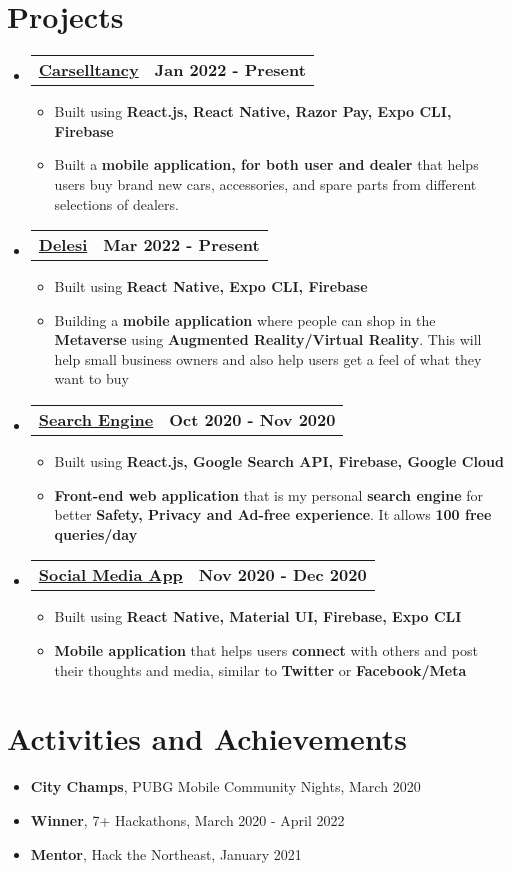\documentclass[letterpaper,7pt]{article}
\makeatletter
\newcommand{\resumeItem}[1]{
  \item\small{
    {#1 \vspace{-2pt}}
  }
}
\newcommand{\resumeProjectHeading}[2]{
    \item
    \begin{tabular*}{1.001\textwidth}{l@{\extracolsep{\fill}}r}
      \small#1 & \textbf{\small #2}\\
    \end{tabular*}\vspace{-7pt}
}
\newcommand{\resumeSubHeadingListStart}{\begin{itemize}[leftmargin=0.0in, label={}]}
\newcommand{\resumeSubHeadingListEnd}{\end{itemize}}
\newcommand{\resumeItemListStart}{\begin{itemize}}
\newcommand{\resumeItemListEnd}{\end{itemize}\vspace{-5pt}}
\makeatother
\begin{document}
\section{Projects}
    \resumeSubHeadingListStart
    \resumeProjectHeading
          {\textbf{\underline{Carselltancy}}} {Jan 2022 - Present}
          \resumeItemListStart
          \vspace{3pt}
          \resumeItem{Built using \textbf{React.js, React Native, Razor Pay, Expo CLI, Firebase}}
            \resumeItem{Built a \textbf{mobile application, for both user and dealer} that helps users buy brand new cars, accessories, and spare parts from different selections of dealers.}
          \resumeItemListEnd
          \vspace{-15pt}
      \resumeProjectHeading
          {\textbf{\underline{Delesi}}} {Mar 2022 - Present}
          \resumeItemListStart
          \vspace{3pt}
          \resumeItem{Built using \textbf{React Native, Expo CLI, Firebase}}
            \resumeItem{Building a \textbf{mobile application} where people can shop in the \textbf{Metaverse} using \textbf{Augmented Reality/Virtual Reality}. This will help small business owners and also help users get a feel of what they want to buy}
          \resumeItemListEnd
          \vspace{-15pt}
      \resumeProjectHeading
          {\textbf{\underline{Search Engine}}}{Oct 2020 - Nov 2020}
          \resumeItemListStart
          \resumeItem{Built using \textbf{React.js, Google Search API, Firebase, Google Cloud}}
            \resumeItem{\textbf{Front-end web application} that is my personal \textbf{search engine} for better \textbf{Safety, Privacy and Ad-free experience}. It allows \textbf{100 free queries/day}}
          \resumeItemListEnd 
        \vspace{-15pt}
        \resumeProjectHeading
          {\textbf{\underline{Social Media App}}}{Nov 2020 - Dec 2020}
          \resumeItemListStart
          \resumeItem{Built using \textbf{React Native, Material UI, Firebase, Expo CLI}}
            \resumeItem{\textbf{Mobile application} that helps users \textbf{connect} with others and post their thoughts and media, similar to \textbf{Twitter} or \textbf{Facebook/Meta}}
          \resumeItemListEnd 
        \vspace{-15pt}
    \resumeSubHeadingListEnd
\vspace{7pt}

%
\section{Activities and Achievements}
 \begin{itemize}[leftmargin=0.15in, label={}]
    \small{\item{
     \resumeItemListStart
        \resumeItem{\textbf{City Champs}, PUBG Mobile Community Nights, March 2020}\\
        \resumeItem{\textbf{Winner}, 7+ Hackathons, March 2020 - April 2022}\\
        \resumeItem{\textbf{Mentor}, Hack the Northeast, January 2021}\\
    \resumeItemListEnd
    }}
 \end{itemize}
 
\end{document}
